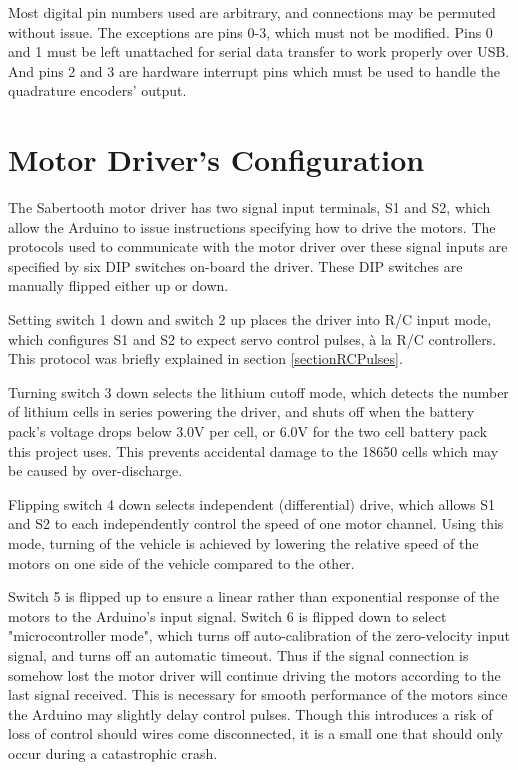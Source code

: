Most digital pin numbers used are arbitrary, and connections may be permuted without issue. The exceptions are pins 0-3, which must not be modified. Pins 0 and 1 must be left unattached for serial data transfer to work properly over USB. And pins 2 and 3 are hardware interrupt pins which must be used to handle the quadrature encoders' output.

\section{Motor Driver's Configuration}
The Sabertooth motor driver has two signal input terminals, S1 and S2, which allow the Arduino to issue instructions specifying how to drive the motors. The protocols used to communicate with the motor driver over these signal inputs are specified by six DIP switches on-board the driver. These DIP switches are manually flipped either up or down.

Setting switch 1 down and switch 2 up places the driver into R/C input mode, which configures S1 and S2 to expect servo control pulses, à la R/C controllers. This protocol was briefly explained in section \ref{sectionRCPulses}. \cite{sabertoothUserGuide}

Turning switch 3 down selects the lithium cutoff mode, which detects the number of lithium cells in series powering the driver, and shuts off when the battery pack's voltage drops below 3.0V per cell, or 6.0V for the two cell battery pack this project uses. This prevents accidental damage to the 18650 cells which may be caused by over-discharge.

Flipping switch 4 down selects independent (differential) drive, which allows S1 and S2 to each independently control the speed of one motor channel. Using this mode, turning of the vehicle is achieved by lowering the relative speed of the motors on one side of the vehicle compared to the other.

Switch 5 is flipped up to ensure a linear rather than exponential response of the motors to the Arduino's input signal. Switch 6 is flipped down to select "microcontroller mode", which turns off auto-calibration of the zero-velocity input signal, and turns off an automatic timeout. Thus if the signal connection is somehow lost the motor driver will continue driving the motors according to the last signal received. This is necessary for smooth performance of the motors since the Arduino may slightly delay control pulses. Though this introduces a risk of loss of control should wires come disconnected, it is a small one that should only occur during a catastrophic crash.

